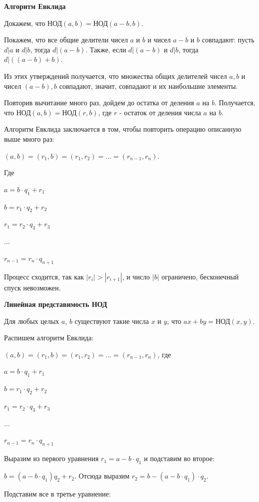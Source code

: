 \centerline{\bf \Huge Алгоритм Евклида}

Докажем, что $\text{НОД}(a,b)=\text{НОД}(a-b,b)$.

Покажем, что все общие делители чисел $a$ и $b$ и чисел $a-b$ и $b$ совпадают: пусть $d|a$ и $d|b$, тогда $d|(a-b)$. Также, если $d|(a-b)$ и $d|b$, тогда $d|((a-b)+b)$.

Из этих утверждений получается, что множества общих делителей чисел $a,b$ и чисел $(a-b),b$ совпадают, значит, совпадают и их наибольшие элементы. 

Повторив вычитание много раз, дойдем до остатка от деления $a$ на $b$. Получается, что  $\text{НОД}(a,b)=\text{НОД}(r,b)$, где $r$ - остаток от деления числа $a$ на $b$.

Алгоритм Евклида заключается в том, чтобы повторить операцию описанную выше много раз: 

$(a,b)=(r_1,b)=(r_1,r_2)=\ldots=(r_{n-1},r_n)$.

Где

$a=b\cdot q_1+r_1$

$b=r_1 \cdot q_2 + r_2$

$r_1=r_2 \cdot q_3 + r_3$

$\ldots$

$r_{n-1}=r_n \cdot q_{n+1} $

Процесс сходится, так как $|r_i| > |r_{i+1}|$, и число $|b|$ ограничено, бесконечный спуск невозможен.


\newpage

\hspace{3mm}

\centerline{\bf \Huge Линейная представимость НОД}

Для любых целых $a$, $b$ существуют такие числа $x$ и $y$, что $ax+by=\text{НОД}(x,y)$.

Распишем алгоритм Евклида:

$(a,b)=(r_1,b)=(r_1,r_2)=\ldots=(r_{n-1},r_n)$, где 

$a=b\cdot q_1+r_1$

$b=r_1 \cdot q_2 + r_2$

$r_1=r_2 \cdot q_3 + r_3$

$\ldots$

$r_{n-1}=r_n \cdot q_{n+1} $


Выразим из первого уравнения $r_1=a-b\cdot q_1$ и подставим во второе:

$b=(a-b \cdot q_1) q_2 + r_2$. Отсюда выразим $r_2=b-(a-b\cdot q_1) \cdot q_2$.

Подставим все в третье уравнение:

